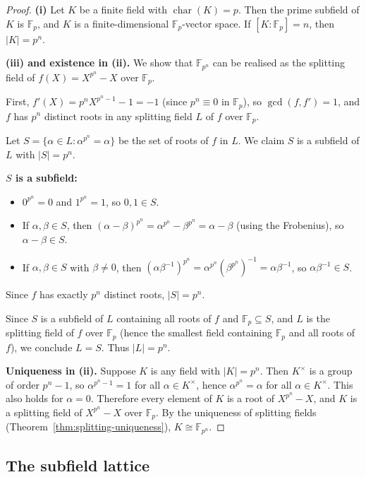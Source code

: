 \documentclass[12pt,a4paper,openany]{book}
\theoremstyle{definition}
\theoremstyle{remark}
\newcommand{\F}{\mathbb{F}}
\DeclareMathOperator{\chr}{char}
\begin{document}
\begin{proof}
\textbf{(i)} Let $K$ be a finite field with $\chr(K) = p$. Then the
prime subfield of $K$ is $\F_p$, and $K$ is a finite-dimensional
$\F_p$-vector space. If $[K:\F_p] = n$, then $|K| = p^n$.

\textbf{(iii) and existence in (ii).} We show that $\F_{p^n}$ can be
realised as the splitting field of $f(X) = X^{p^n} - X$ over $\F_p$.

First, $f'(X) = p^n X^{p^n - 1} - 1 = -1$ (since $p^n \equiv 0$ in
$\F_p$), so $\gcd(f, f') = 1$, and $f$ has $p^n$ distinct roots in
any splitting field $L$ of $f$ over $\F_p$.

Let $S = \{ \alpha \in L : \alpha^{p^n} = \alpha \}$ be the set of
roots of $f$ in $L$. We claim $S$ is a subfield of $L$ with
$|S| = p^n$.

\textbf{$S$ is a subfield:}
\begin{itemize}
  \item $0^{p^n} = 0$ and $1^{p^n} = 1$, so $0, 1 \in S$.
  \item If $\alpha, \beta \in S$, then
    $(\alpha - \beta)^{p^n} = \alpha^{p^n} - \beta^{p^n}
    = \alpha - \beta$ (using the Frobenius), so
    $\alpha - \beta \in S$.
  \item If $\alpha, \beta \in S$ with $\beta \ne 0$, then
    $(\alpha\beta^{-1})^{p^n} = \alpha^{p^n}(\beta^{p^n})^{-1}
    = \alpha \beta^{-1}$, so $\alpha\beta^{-1} \in S$.
\end{itemize}
Since $f$ has exactly $p^n$ distinct roots, $|S| = p^n$.

Since $S$ is a subfield of $L$ containing all roots of $f$ and
$\F_p \subseteq S$, and $L$ is the splitting field of $f$ over
$\F_p$ (hence the smallest field containing $\F_p$ and all roots of
$f$), we conclude $L = S$. Thus $|L| = p^n$.

\textbf{Uniqueness in (ii).} Suppose $K$ is any field with
$|K| = p^n$. Then $K^{\times}$ is a group of order $p^n - 1$, so
$\alpha^{p^n - 1} = 1$ for all $\alpha \in K^{\times}$, hence
$\alpha^{p^n} = \alpha$ for all $\alpha \in K^{\times}$. This also
holds for $\alpha = 0$. Therefore every element of $K$ is a root of
$X^{p^n} - X$, and $K$ is a splitting field of $X^{p^n} - X$ over
$\F_p$. By the uniqueness of splitting fields
(Theorem~\ref{thm:splitting-uniqueness}), $K \cong \F_{p^n}$.
\end{proof}

\subsection{The subfield lattice}
\label{subsec:subfield-lattice}
\end{document}
